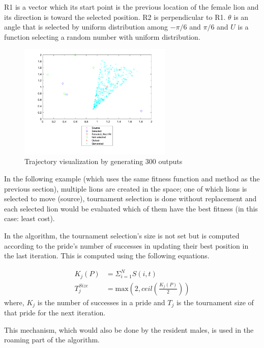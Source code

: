 {R1} is a vector which its start point is the previous location of the female lion and its direction is toward the selected position. {R2} is perpendicular to {R1}. $\theta$ is an angle that is selected by uniform distribution among $-\pi/6$ and $\pi/6$ and $U$ is a function selecting a random number with uniform distribution.

\begin{figure}[h]
\begin{center}
\includegraphics[width=0.65\textwidth]{img/moving/move-out-legend}
\caption{Trajectory visualization by generating 300 outputs}
\end{center}
\end{figure}

In the following example (which uses the same fitness function and method as the previous section), multiple lions are created in the space; one of which lions is selected to move (source), tournament selection is done without replacement and each selected lion would be evaluated which of them have the best fitness (in this case: least cost).

In the algorithm, the tournament selection's size is not set but is computed according to the pride's number of successes in updating their best position in the last iteration. This is computed using the following equations.

\begin{align*}
    K_j(P) &= \Sigma_{i=1}^N  S(i,t) \\
    T_j^{Size} &= \text{max}\left(2, ceil\left(\frac{K_j(P)}{2}\right)\right)
\end{align*}
where, $K_j$ is the number of successes in a pride and $T_j$ is the tournament size of that pride for the next iteration.

This mechanism, which would also be done by the resident males, is used in the roaming part of the algorithm.

